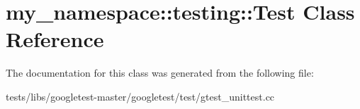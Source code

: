 \hypertarget{classmy__namespace_1_1testing_1_1Test}{}\section{my\+\_\+namespace\+:\+:testing\+:\+:Test Class Reference}
\label{classmy__namespace_1_1testing_1_1Test}


The documentation for this class was generated from the following file\+:\begin{DoxyCompactItemize}
\item 
tests/libs/googletest-\/master/googletest/test/gtest\+\_\+unittest.\+cc\end{DoxyCompactItemize}
